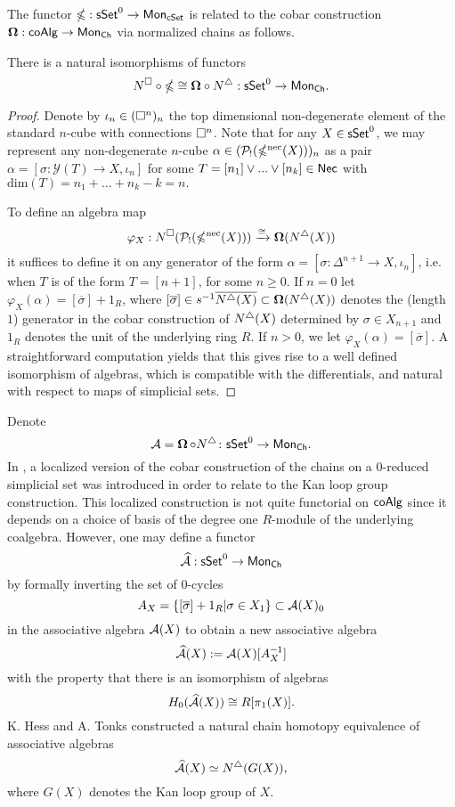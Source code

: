 The functor $\mathbb{\Omega}: \mathsf{sSet}^0 \to \mathsf{Mon}_{\mathsf{cSet}}$ is related to the cobar construction $\mathbf{\Omega}: \mathsf{coAlg} \to \mathsf{Mon}_{\mathsf{Ch}}$ via normalized chains as follows.

\begin{proposition} \label{gcobarandcobar}
There is a natural isomorphisms of functors 
$$N^{\square} \circ \mathbb{\Omega} \cong \mathbf{\Omega} \circ N^{\triangle}: \mathsf{sSet}^0 \to \mathsf{Mon}_{\mathsf{Ch}}.$$
\end{proposition}

\begin{proof} 
Denote by $\iota_n \in (\square^n)_n$ the top dimensional non-degenerate element of the standard $n$-cube with connections $\square^n$. Note that for any $X \in \mathsf{sSet}^0$, we may represent any non-degenerate $n$-cube $\alpha \in (\mathcal{P}_!(\mathbb{\Omega}^{\text{nec}}(X)))_n$ as a pair $\alpha=[\sigma: \mathcal{Y}(T) \to X, \iota_n]$ for some $T=[n_1] \vee ... \vee [n_k] \in \mathsf{Nec}$ with $\text{dim}(T)=n_1+ ...+n_k-k=n.$

To define an algebra map
$$\varphi_X: N^{\square}(\mathcal{P}_!(\mathbb{\Omega}^{\text{nec}}(X))) \xrightarrow{\cong} \mathbf{\Omega}(N^{\triangle}(X))$$
it suffices to define it on any generator of the form $\alpha=[\sigma \colon \Delta^{n+1} \to X, \iota_{n}]$, i.e. when $T$ is of the form $T=[n+1]$, for some $n\geq0$. If $n=0$ let $\varphi_X(\alpha)= [\overline{\sigma}]+ 1_R$, where $[\overline{\sigma}] \in s^{-1} \overline{ N^{\triangle}(X)} \subset \mathbf{\Omega}(N^{\triangle}(X))$ denotes the (length $1$) generator in the cobar construction of $N^{\triangle}(X)$ determined by $\sigma \in X_{n+1}$ and $1_R$ denotes the unit of the underlying ring $R$. If $n>0$, we let $\varphi_X(\alpha)=[\overline{\sigma}]$. A straightforward computation yields that this gives rise to a well defined isomorphism of algebras, which is compatible with the differentials, and natural with respect to maps of simplicial sets.  
\end{proof}
Denote $$\mathcal{A}= \operatorname{\mathbf{\Omega}} \circ N^{\triangle} \colon \mathsf{sSet}^0 \to \mathsf{Mon}_{\mathsf{Ch}}.$$ In \cite{Hess-Tonks}, a localized version of the cobar construction of the chains on a $0$-reduced simplicial set was introduced in order to relate to the Kan loop group construction. This localized construction is not quite functorial on $\mathsf{coAlg}$ since it depends on a choice of basis of the degree one $R$-module of the underlying coalgebra. However, one may define a functor $$\widehat{\mathcal{A}}: \mathsf{sSet}^0 \to \mathsf{Mon}_{\mathsf{Ch}}$$
by formally inverting the set of $0$-cycles $$A_X=\{ [\overline{\sigma}]+1_R | \sigma \in X_1 \} \subset \mathcal{A}(X)_0$$ in the associative algebra $\mathcal{A}(X)$ to obtain a new associative algebra
$$\widehat{\mathcal{A}}(X):= \mathcal{A}(X)[A_X^{-1}]$$
with the property that there is an isomorphism of algebras $$H_0(\widehat{\mathcal{A}}(X)) \cong R[\pi_1(X)].$$
K. Hess and A. Tonks constructed a natural chain homotopy equivalence of associative algebras $$\widehat{\mathcal{A}}(X)\simeq N^{\triangle}(G(X)),$$ where $G(X)$ denotes the Kan loop group of $X$. 

